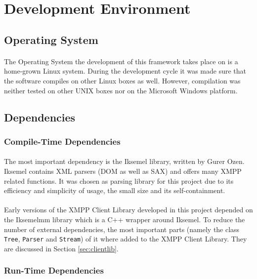 \section{Development Environment}

\subsection{Operating System}
\paragraph{}
The Operating System the development of this framework takes place on is a home-grown Linux system. During the development cycle it was made sure that the software compiles on other Linux boxes as well. However, compilation was neither tested on other UNIX boxes nor on the Microsoft Windows platform.

\subsection{Dependencies}
\label{sec:depend}

\subsubsection{Compile-Time Dependencies}
\label{sec:compdepend}
\paragraph{}
The most important dependency is the Iksemel library, written by Gurer Ozen. Iksemel contains XML parsers (DOM as well as SAX) and offers many XMPP related functions. It was chosen as parsing library for this project due to its efficiency and simplicity of usage, the small size and its self-containment.

\paragraph{}
Early versions of the XMPP Client Library developed in this project depended on the Iksemelmm library which is a C++ wrapper around Iksemel. To reduce the number of external dependencies, the most important parts (namely the class \texttt{Tree}, \texttt{Parser} and \texttt{Stream}) of it where added to the XMPP Client Library. They are discussed in Section \ref{sec:clientlib}.


\subsubsection{Run-Time Dependencies}
